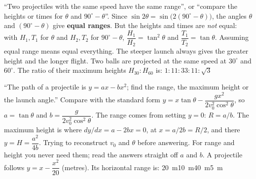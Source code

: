 {``Two projectiles with the same speed have the same range'', or ``compare the heights or times for
$\theta$ and $90^\circ-\theta$''.}
{Since $\sin2\theta=\sin\big(2(90^\circ-\theta)\big)$, the angles $\theta$ and $(90^\circ-\theta)$ give
\textbf{equal ranges}. But the heights and times are \emph{not} equal: with $H_1,T_1$ for $\theta$ and
$H_2,T_2$ for $90^\circ-\theta$, $\dfrac{H_1}{H_2}=\tan^2\theta$ and $\dfrac{T_1}{T_2}=\tan\theta$.}
{Assuming equal range means equal everything. The steeper launch always gives the greater height and the
longer flight.}
{Two balls are projected at the same speed at $30^\circ$ and $60^\circ$. The ratio of their maximum
heights $H_{30}:H_{60}$ is:}
{$1:1$}{$1:3$}{$3:1$}{$1:\sqrt3$}

{``The path of a projectile is $y=ax-bx^2$; find the range, the maximum height or the launch angle.''}
{Compare with the standard form $y=x\tan\theta-\dfrac{gx^2}{2v_0^2\cos^2\theta}$, so $a=\tan\theta$ and
$b=\dfrac{g}{2v_0^2\cos^2\theta}$. The range comes from setting $y=0$: $R=a/b$. The maximum height is
where $dy/dx=a-2bx=0$, at $x=a/2b=R/2$, and there $y=H=\dfrac{a^2}{4b}$.}
{Trying to reconstruct $v_0$ and $\theta$ before answering. For range and height you never need them;
read the answers straight off $a$ and $b$.}
{A projectile follows $y=x-\dfrac{x^2}{20}$ (metres). Its horizontal range is:}
{\SI{20}{m}}{\SI{10}{m}}{\SI{40}{m}}{\SI{5}{m}}
